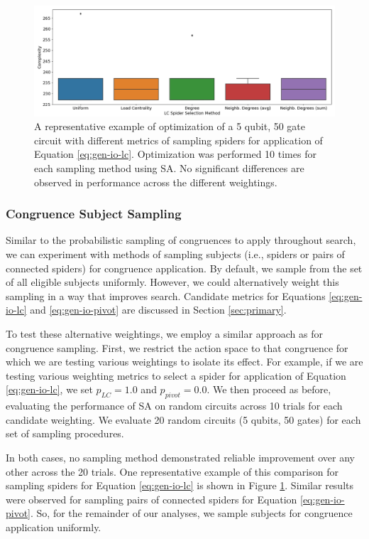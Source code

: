 \begin{figure}[t]
\centering
\includegraphics[width=13cm]{img/subj-sampling-ex.png}
\caption{
  A representative example of optimization of a 5 qubit, 50 gate circuit with different metrics of sampling spiders for application of Equation \ref{eq:gen-io-lc}.
  Optimization was performed 10 times for each sampling method using SA.
  No significant differences are observed in performance across the different weightings.
}
\label{fig:subj-sampling}
\end{figure}


\subsubsection*{Congruence Subject Sampling}

Similar to the probabilistic sampling of congruences to apply throughout search, we can experiment with methods of sampling subjects (i.e., spiders or pairs of connected spiders) for congruence application.
By default, we sample from the set of all eligible subjects uniformly.
However, we could alternatively weight this sampling in a way that improves search.
Candidate metrics for Equations \ref{eq:gen-io-lc} and \ref{eq:gen-io-pivot} are discussed in Section \ref{sec:primary}.

To test these alternative weightings, we employ a similar approach as for congruence sampling.
First, we restrict the action space to that congruence for which we are testing various weightings to isolate its effect.
For example, if we are testing various weighting metrics to select a spider for application of Equation \ref{eq:gen-io-lc}, we set $p_{LC} = 1.0$ and $p_{pivot} = 0.0$.
We then proceed as before, evaluating the performance of SA on random circuits across 10 trials for each candidate weighting.
We evaluate 20 random circuits (5 qubits, 50 gates) for each set of sampling procedures.

In both cases, no sampling method demonstrated reliable improvement over any other across the 20 trials.
One representative example of this comparison for sampling spiders for Equation \ref{eq:gen-io-lc} is shown in Figure \ref{fig:subj-sampling}.
Similar results were observed for sampling pairs of connected spiders for Equation \ref{eq:gen-io-pivot}.
So, for the remainder of our analyses, we sample subjects for congruence application uniformly.


